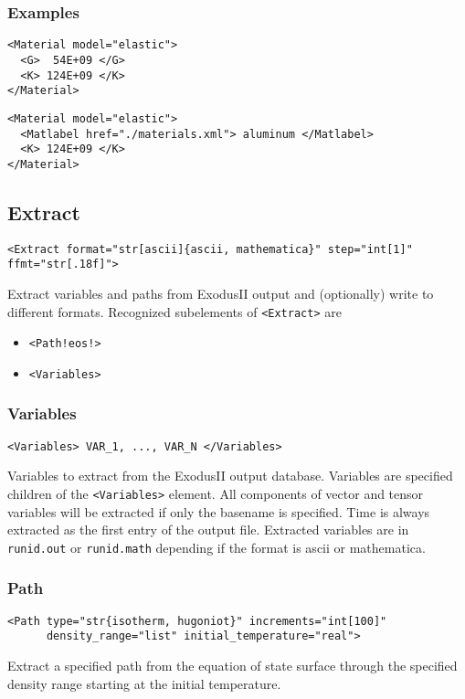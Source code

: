 \documentclass[11pt]{report}
\renewcommand{\tag}[1]{\texttt{<#1>}}
\newcommand{\supporting}[1]{\texttt{Supporting Drivers: #1}}
\newcommand{\sd}[1]{\texttt{!#1!}}
\begin{document}
\subsubsection{Examples}
\begin{verbatim}
<Material model="elastic">
  <G>  54E+09 </G>
  <K> 124E+09 </K>
</Material>
\end{verbatim}

\begin{verbatim}
<Material model="elastic">
  <Matlabel href="./materials.xml"> aluminum </Matlabel>
  <K> 124E+09 </K>
</Material>
\end{verbatim}

\subsection{Extract}
\begin{verbatim}
<Extract format="str[ascii]{ascii, mathematica}" step="int[1]" ffmt="str[.18f]">
\end{verbatim}
%
Extract variables and paths from ExodusII output and (optionally) write to
different formats. Recognized subelements of \tag{Extract} are
%
\begin{itemize}
  \item \tag{Path\sd{eos}}
  \item \tag{Variables}
\end{itemize}

\subsubsection{Variables}
\begin{verbatim}
<Variables> VAR_1, ..., VAR_N </Variables>
\end{verbatim}
%
Variables to extract from the ExodusII output database. Variables are specified
children of the \tag{Variables} element. All components of vector and tensor
variables will be extracted if only the basename is specified. Time is always
extracted as the first entry of the output file.  Extracted variables are in
\texttt{runid.out} or \texttt{runid.math} depending if the format is ascii or
mathematica.

\subsubsection{Path}
\begin{verbatim}
<Path type="str{isotherm, hugoniot}" increments="int[100]"
      density_range="list" initial_temperature="real">
\end{verbatim}
%
Extract a specified path from the equation of state surface through the
specified density range starting at the initial temperature.
\end{document}
